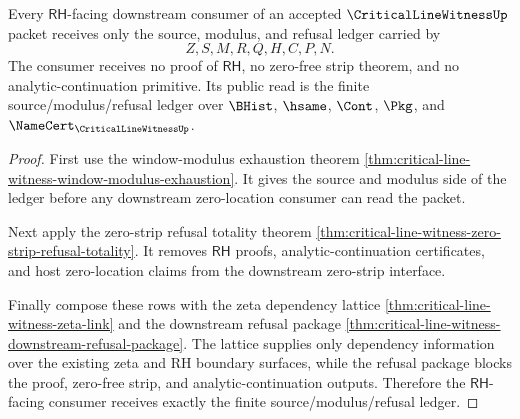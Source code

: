 \begin{theorem}
\label{thm:critical-line-witness-rh-source-ledger-closure}
Every $\mathsf{RH}$-facing downstream consumer of an accepted $\CriticalLineWitnessUp$ packet receives only the source, modulus, and refusal ledger carried by
$$
Z,S,M,R,Q,H,C,P,N.
$$
The consumer receives no proof of $\mathsf{RH}$, no zero-free strip theorem, and no analytic-continuation primitive. Its public read is the finite source/modulus/refusal ledger over $\BHist$, $\hsame$, $\Cont$, $\Pkg$, and $\NameCert_{\CriticalLineWitnessUp}$.
\end{theorem}
\begin{proof}
First use the window-modulus exhaustion theorem \autoref{thm:critical-line-witness-window-modulus-exhaustion}. It gives the source and modulus side of the ledger before any downstream zero-location consumer can read the packet.

Next apply the zero-strip refusal totality theorem \autoref{thm:critical-line-witness-zero-strip-refusal-totality}. It removes $\mathsf{RH}$ proofs, analytic-continuation certificates, and host zero-location claims from the downstream zero-strip interface.

Finally compose these rows with the zeta dependency lattice \autoref{thm:critical-line-witness-zeta-link} and the downstream refusal package \autoref{thm:critical-line-witness-downstream-refusal-package}. The lattice supplies only dependency information over the existing zeta and RH boundary surfaces, while the refusal package blocks the proof, zero-free strip, and analytic-continuation outputs. Therefore the $\mathsf{RH}$-facing consumer receives exactly the finite source/modulus/refusal ledger.
\end{proof}
